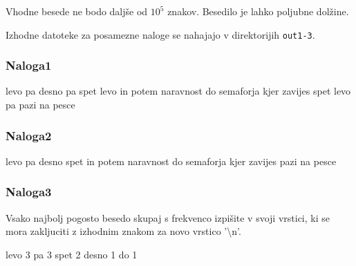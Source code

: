 Vhodne besede ne bodo daljše od $10^5$ znakov.
Besedilo je lahko poljubne dolžine.


\izhod

Izhodne datoteke za posamezne naloge se nahajajo v direktorijih \texttt{out1-3}.

\subsubsection*{Naloga1}

\begin{primerIzhod}
levo
pa
desno
pa
spet
levo
in
potem
naravnost
do
semaforja
kjer
zavijes
spet
levo
pa
pazi
na
pesce
\end{primerIzhod}

\subsubsection*{Naloga2}

\begin{primerIzhod}
levo
pa
desno
spet
in
potem
naravnost
do
semaforja
kjer
zavijes
pazi
na
pesce
\end{primerIzhod}

\subsubsection*{Naloga3}

Vsako najbolj pogosto besedo skupaj s frekvenco izpišite v svoji vrstici, ki se
mora zakljuciti z izhodnim znakom za novo vrstico
'\textbackslash n'.

\begin{primerIzhod}
levo 3
pa 3
spet 2
desno 1
do 1
\end{primerIzhod}




